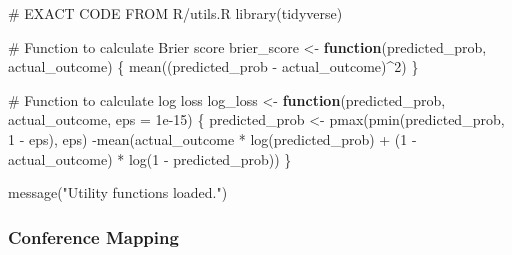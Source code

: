 \documentclass[
  letterpaper,
  DIV=11,
  numbers=noendperiod]{scrartcl}
\newenvironment{Shaded}{\begin{snugshade}}{\end{snugshade}}
\newcommand{\AttributeTok}[1]{\textcolor[rgb]{0.40,0.45,0.13}{#1}}
\newcommand{\CommentTok}[1]{\textcolor[rgb]{0.37,0.37,0.37}{#1}}
\newcommand{\ControlFlowTok}[1]{\textcolor[rgb]{0.00,0.23,0.31}{\textbf{#1}}}
\newcommand{\DecValTok}[1]{\textcolor[rgb]{0.68,0.00,0.00}{#1}}
\newcommand{\FloatTok}[1]{\textcolor[rgb]{0.68,0.00,0.00}{#1}}
\newcommand{\FunctionTok}[1]{\textcolor[rgb]{0.28,0.35,0.67}{#1}}
\newcommand{\NormalTok}[1]{\textcolor[rgb]{0.00,0.23,0.31}{#1}}
\newcommand{\OtherTok}[1]{\textcolor[rgb]{0.00,0.23,0.31}{#1}}
\newcommand{\SpecialCharTok}[1]{\textcolor[rgb]{0.37,0.37,0.37}{#1}}
\newcommand{\StringTok}[1]{\textcolor[rgb]{0.13,0.47,0.30}{#1}}
\begin{document}
\begin{Shaded}
\begin{Highlighting}[]
\CommentTok{\# EXACT CODE FROM R/utils.R}
\FunctionTok{library}\NormalTok{(tidyverse)}

\CommentTok{\# Function to calculate Brier score}
\NormalTok{brier\_score }\OtherTok{\textless{}{-}} \ControlFlowTok{function}\NormalTok{(predicted\_prob, actual\_outcome) \{}
  \FunctionTok{mean}\NormalTok{((predicted\_prob }\SpecialCharTok{{-}}\NormalTok{ actual\_outcome)}\SpecialCharTok{\^{}}\DecValTok{2}\NormalTok{)}
\NormalTok{\}}

\CommentTok{\# Function to calculate log loss}
\NormalTok{log\_loss }\OtherTok{\textless{}{-}} \ControlFlowTok{function}\NormalTok{(predicted\_prob, actual\_outcome, }\AttributeTok{eps =} \FloatTok{1e{-}15}\NormalTok{) \{}
\NormalTok{  predicted\_prob }\OtherTok{\textless{}{-}} \FunctionTok{pmax}\NormalTok{(}\FunctionTok{pmin}\NormalTok{(predicted\_prob, }\DecValTok{1} \SpecialCharTok{{-}}\NormalTok{ eps), eps)}
  \SpecialCharTok{{-}}\FunctionTok{mean}\NormalTok{(actual\_outcome }\SpecialCharTok{*} \FunctionTok{log}\NormalTok{(predicted\_prob) }\SpecialCharTok{+}\NormalTok{ (}\DecValTok{1} \SpecialCharTok{{-}}\NormalTok{ actual\_outcome) }\SpecialCharTok{*} \FunctionTok{log}\NormalTok{(}\DecValTok{1} \SpecialCharTok{{-}}\NormalTok{ predicted\_prob))}
\NormalTok{\}}

\FunctionTok{message}\NormalTok{(}\StringTok{"Utility functions loaded."}\NormalTok{)}
\end{Highlighting}
\end{Shaded}

\subsubsection{Conference Mapping}\label{conference-mapping}
\end{document}
